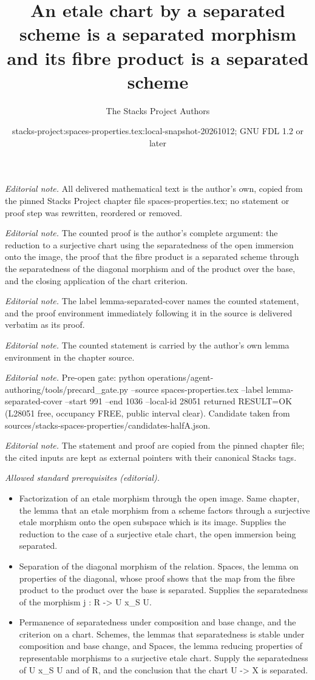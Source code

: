 \documentclass[10pt,a4paper]{amsart}
\title{An etale chart by a separated scheme is a separated morphism and its fibre product is a separated scheme}
\author{The Stacks Project Authors}
\date{stacks-project:spaces-properties.tex:local-snapshot-20261012; GNU FDL 1.2 or later}
\theoremstyle{plain}
\theoremstyle{definition}
\theoremstyle{remark}
\numberwithin{equation}{subsection}
\begin{document}
\maketitle
\noindent\textit{Editorial note.} All delivered mathematical text is the author's own, copied from the pinned Stacks Project chapter file spaces-properties.tex; no statement or proof step was rewritten, reordered or removed.\par\medskip
\noindent\textit{Editorial note.} The counted proof is the author's complete argument: the reduction to a surjective chart using the separatedness of the open immersion onto the image, the proof that the fibre product is a separated scheme through the separatedness of the diagonal morphism and of the product over the base, and the closing application of the chart criterion.\par\medskip
\noindent\textit{Editorial note.} The label lemma-separated-cover names the counted statement, and the proof environment immediately following it in the source is delivered verbatim as its proof.\par\medskip
\noindent\textit{Editorial note.} The counted statement is carried by the author's own lemma environment in the chapter source.\par\medskip
\noindent\textit{Editorial note.} Pre-open gate: python operations/agent-authoring/tools/precard\_gate.py --source spaces-properties.tex --label lemma-separated-cover --start 991 --end 1036 --local-id 28051 returned RESULT=OK (L28051 free, occupancy FREE, public interval clear). Candidate taken from sources/stacks-spaces-properties/candidates-halfA.json.\par\medskip
\noindent\textit{Editorial note.} The statement and proof are copied from the pinned chapter file; the cited inputs are kept as external pointers with their canonical Stacks tags.\par\medskip
\noindent\textit{Allowed standard prerequisites (editorial).}\begin{itemize}
\item Factorization of an etale morphism through the open image. Same chapter, the lemma that an etale morphism from a scheme factors through a surjective etale morphism onto the open subspace which is its image. Supplies the reduction to the case of a surjective etale chart, the open immersion being separated.
\item Separation of the diagonal morphism of the relation. Spaces, the lemma on properties of the diagonal, whose proof shows that the map from the fibre product to the product over the base is separated. Supplies the separatedness of the morphism j : R -> U x\_S U.
\item Permanence of separatedness under composition and base change, and the criterion on a chart. Schemes, the lemmas that separatedness is stable under composition and base change, and Spaces, the lemma reducing properties of representable morphisms to a surjective etale chart. Supply the separatedness of U x\_S U and of R, and the conclusion that the chart U -> X is separated.
\end{itemize}\medskip
\end{document}
